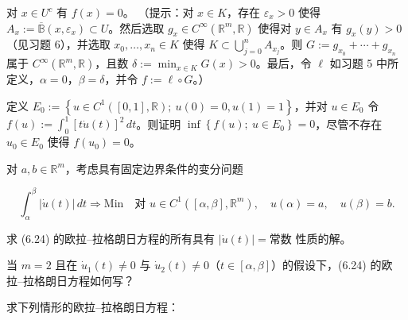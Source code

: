 \begin{exercises}
\begin{items}
对 $ x \in U^{c} $ 有 $ f(x) = 0 $。
（提示：对 $ x \in K $，存在 $ \varepsilon_{x} > 0 $ 使得 $ A_{x} := \overline{\mathbb{B}}(x, \varepsilon_{x}) \subset U $。然后选取 $ g_{x} \in C^{\infty}(\mathbb{R}^{m}, \mathbb{R}) $ 使得对 $ y \in A_{x} $ 有 $ g_{x}(y) > 0 $（见习题 6），并选取 $ x_{0}, \ldots, x_{n} \in K $ 使得 $ K \subset \bigcup_{j=0}^{n} A_{x_{j}} $。则 $ G := g_{x_{0}} + \cdots + g_{x_{n}} $ 属于 $ C^{\infty}(\mathbb{R}^{m}, \mathbb{R}) $，且数 $ \delta := \min_{x \in K} G(x) > 0 $。最后，令 $ \ell $ 如习题 5 中所定义，$ \alpha = 0 $，$ \beta = \delta $，并令 $ f := \ell \circ G $。）

\end{items}

\item

定义 $ E_{0} := \left\{ u \in C^{1}([0, 1], \mathbb{R}) ;\ u(0) = 0, u(1) = 1 \right\} $，并对 $ u \in E_{0} $ 令 $ f(u) := \int_{0}^{1} [t\dot{u}(t)]^{2} \, dt $。则证明 $ \inf\left\{ f(u) ;\ u \in E_{0} \right\} = 0 $，尽管不存在 $ u_{0} \in E_{0} $ 使得 $ f(u_{0}) = 0 $。

\item

对 $ a, b \in \mathbb{R}^{m} $，考虑具有固定边界条件的变分问题

\begin{equation}
\int_{\alpha}^{\beta} |\dot{u}(t)| \, dt \Rightarrow \mathrm{Min} \quad \text{对 } u \in C^{1}([\alpha, \beta], \mathbb{R}^{m}) , \quad u(\alpha) = a , \quad u(\beta) = b .\tag{6.24}
\end{equation}

\begin{items}
\item

求 (6.24) 的欧拉–拉格朗日方程的所有具有 $ |\dot{u}(t)| = \text{常数} $ 性质的解。

\item

当 $ m = 2 $ 且在 $ \dot{u}_{1}(t) \ne 0 $ 与 $ \dot{u}_{2}(t) \ne 0 $（$ t \in [\alpha, \beta] $）的假设下，(6.24) 的欧拉–拉格朗日方程如何写？

\end{items}

\item

求下列情形的欧拉–拉格朗日方程：

\begin{items}
\item


\end{items}
\end{exercises}
